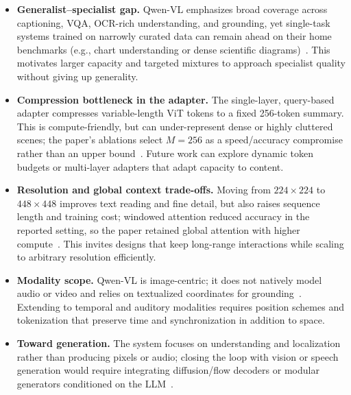 \begin{enrichment}
\begin{enrichment}
        \begin{itemize}
            \item \textbf{Generalist--specialist gap.} Qwen\mbox{-}VL emphasizes broad coverage across captioning, VQA, OCR\mbox{-}rich understanding, and grounding, yet single\mbox{-}task systems trained on narrowly curated data can remain ahead on their home benchmarks (e.g., chart understanding or dense scientific diagrams)~\cite[Sec.~5; Tables~4--6]{bai2023_qwenvl}. This motivates larger capacity and targeted mixtures to approach specialist quality without giving up generality.
            \item \textbf{Compression bottleneck in the adapter.} The single\mbox{-}layer, query\mbox{-}based adapter compresses variable\mbox{-}length ViT tokens to a fixed 256\mbox{-}token summary. This is compute\mbox{-}friendly, but can under-represent dense or highly cluttered scenes; the paper’s ablations select $M{=}256$ as a speed/accuracy compromise rather than an upper bound~\cite[Sec.~2.1; Appx.~E.2]{bai2023_qwenvl}. Future work can explore dynamic token budgets or multi\mbox{-}layer adapters that adapt capacity to content.
        \item \textbf{Resolution and global context trade\mbox{-}offs.} Moving from $224{\times}224$ to $448{\times}448$ improves text reading and fine detail, but also raises sequence length and training cost; windowed attention reduced accuracy in the reported setting, so the paper retained global attention with higher compute~\cite[Sec.~3.2; Appx.~E.3]{bai2023_qwenvl}. This invites designs that keep long\mbox{-}range interactions while scaling to arbitrary resolution efficiently.
        \item \textbf{Modality scope.} Qwen\mbox{-}VL is image\mbox{-}centric; it does not natively model audio or video and relies on textualized coordinates for grounding~\cite[Sec.~2--3]{bai2023_qwenvl}. Extending to temporal and auditory modalities requires position schemes and tokenization that preserve time and synchronization in addition to space.
        \item \textbf{Toward generation.} The system focuses on understanding and localization rather than producing pixels or audio; closing the loop with vision or speech generation would require integrating diffusion/flow decoders or modular generators conditioned on the LLM~\cite[Sec.~5]{bai2023_qwenvl}.
        \end{itemize}
        

\end{enrichment}
\end{enrichment}
